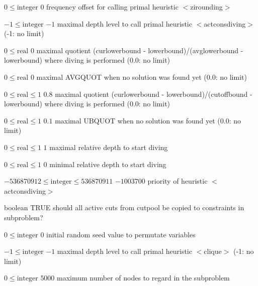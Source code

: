 %
{$0\leq\textrm{integer}$}%
{$0$}%
{frequency offset for calling primal heuristic $<$zirounding$>$}%
{}

%
{$-1\leq\textrm{integer}$}%
{$-1$}%
{maximal depth level to call primal heuristic $<$actconsdiving$>$ (-1: no limit)}%
{}

%
{$0\leq\textrm{real}$}%
{$0$}%
{maximal quotient (curlowerbound - lowerbound)/(avglowerbound - lowerbound) where diving is performed (0.0: no limit)}%
{}

%
{$0\leq\textrm{real}$}%
{$0$}%
{maximal AVGQUOT when no solution was found yet (0.0: no limit)}%
{}

%
{$0\leq\textrm{real}\leq1$}%
{$0.8$}%
{maximal quotient (curlowerbound - lowerbound)/(cutoffbound - lowerbound) where diving is performed (0.0: no limit)}%
{}

%
{$0\leq\textrm{real}\leq1$}%
{$0.1$}%
{maximal UBQUOT when no solution was found yet (0.0: no limit)}%
{}

%
{$0\leq\textrm{real}\leq1$}%
{$1$}%
{maximal relative depth to start diving}%
{}

%
{$0\leq\textrm{real}\leq1$}%
{$0$}%
{minimal relative depth to start diving}%
{}

%
{$-536870912\leq\textrm{integer}\leq536870911$}%
{$-1003700$}%
{priority of heuristic $<$actconsdiving$>$}%
{}

%
{boolean}%
{TRUE}%
{should all active cuts from cutpool be copied to constraints in subproblem?}%
{}

%
{$0\leq\textrm{integer}$}%
{$0$}%
{initial random seed value to permutate variables}%
{}

%
{$-1\leq\textrm{integer}$}%
{$-1$}%
{maximal depth level to call primal heuristic $<$clique$>$ (-1: no limit)}%
{}

%
{$0\leq\textrm{integer}$}%
{$5000$}%
{maximum number of nodes to regard in the subproblem}%
{}

